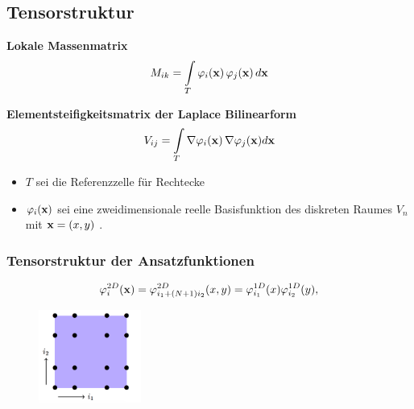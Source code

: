\subsection{Tensorstruktur}

\begin{frame}

\begin{framed}
\textbf{Lokale Massenmatrix}
\begin{equation*} \label{eq:mass}
M_{ik} = \int\limits_{T} \varphi_i (\bold{x}) \, \varphi_j (\bold{x}) \, d\bold{x}
\end{equation*}

\textbf{Elementsteifigkeitsmatrix der Laplace Bilinearform}
\begin{equation*}
V_{ij} = \int\limits_{T} \nabla \varphi_i(\bold{x}) \, \nabla \varphi_j(\bold{x})  d \bold{x}
\end{equation*}
\end{framed}

\begin{itemize}
\item $T$ sei die Referenzzelle für Rechtecke
\item $\varphi_i(\bold{x})$ sei eine zweidimensionale reelle Basisfunktion des diskreten Raumes $V_n$ mit $\bold{x}=(x,y)$ .
\end{itemize}

\end{frame}



\begin{frame}
\frametitle{Tensorstruktur der Ansatzfunktionen}

\begin{equation*} \label{eq:tensor}
\varphi^{2D}_i(\bold{x})=\varphi^{2D}_{i_1+(N+1)i_2}(x,y)=\varphi^{1D}_{i_1}(x)\varphi^{1D}_{i_2}(y),
\end{equation*}

\begin{figure}[ht] 
	\centering
  \includegraphics[width=0.3\textwidth]{lexi.png}
	\caption{ \cite[3]{Teachlet}}
	\label{fig:lexi}
\end{figure}


\end{frame}

